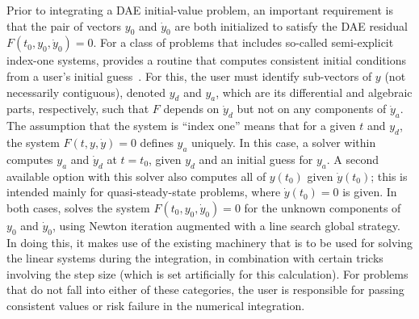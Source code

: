 Prior to integrating a DAE initial-value problem, an important requirement 
is that the pair of vectors $y_0$ and $\dot y_0$ are both initialized to
satisfy the DAE residual $F(t_0,y_0, \dot y_0) = 0$.
For a class of problems that includes so-called
semi-explicit index-one systems, {\idas} provides a routine that computes
consistent initial conditions from a user's initial guess~\cite{BHP:98}.  
For this, the user must identify sub-vectors of $y$
(not necessarily contiguous), denoted $y_d$ and $y_a$, which are its
differential and algebraic parts, respectively, such that $F$ depends
on $\dot y_d$ but not on any components of $\dot y_a$.  The assumption that
the system is ``index one'' means that for a given $t$ and $y_d$, the
system $F(t, y, \dot y) = 0$ defines $y_a$ uniquely.  In this case, a solver
within {\idas} computes $y_a$ and $\dot y_d$ at $t = t_0$, given $y_d$ and an
initial guess for $y_a$.  A second available option with this solver
also computes all of $y(t_0)$ given $\dot y(t_0)$; this is intended mainly
for quasi-steady-state problems, where $\dot y(t_0) = 0$ is given.
In both cases, {\idas} solves the system $F(t_0, y_0, \dot y_0) = 0$ for the
unknown components of $y_0$ and $\dot y_0$, using Newton iteration
augmented with a line search global strategy.  In doing this, it makes
use of the existing machinery that is to be used for solving the
linear systems during the integration, in combination with certain
tricks involving the step size (which is set artificially for this
calculation).
For problems that do not fall into either of these categories, the
user is responsible for passing consistent values or risk failure in
the numerical integration.

